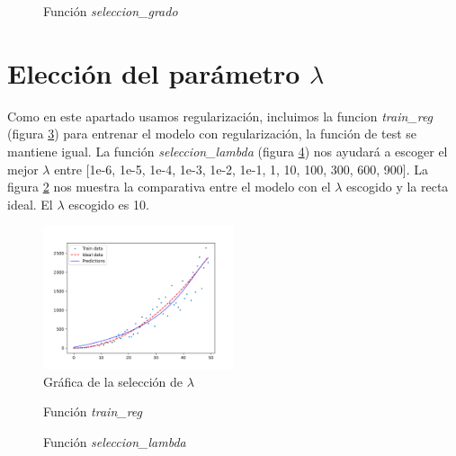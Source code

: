 \documentclass[6pt]{../../shared/AiTex}
\begin{document}
\begin{figure}[H]
    \centering
    
    \caption{Función \textit{seleccion\_grado}}
    \label{fig:seleccion_grado}
\end{figure}

\section{Elección del parámetro $\lambda$}

Como en este apartado usamos regularización, incluimos la funcion \textit{train\_reg} (figura \ref{fig:train_reg}) para entrenar el modelo con regularización, la función de test se mantiene igual. La función \textit{seleccion\_lambda} (figura \ref{fig:seleccion_lambda}) nos ayudará a escoger el mejor $\lambda$ entre [1e-6, 1e-5, 1e-4, 1e-3, 1e-2, 1e-1, 1, 10, 100, 300, 600, 900]. La figura \ref{fig:seleccion_lambda_plot} nos muestra la comparativa entre el modelo con el $\lambda$ escogido y la recta ideal. El $\lambda$ escogido es 10.

\begin{figure}[H]
    \centering
    \includegraphics[width=0.5\textwidth]{./images/lambda.png}
    \caption{Gráfica de la selección de $\lambda$}
    \label{fig:seleccion_lambda_plot}
\end{figure}

\begin{figure}[H]
    \centering
    
    \caption{Función \textit{train\_reg}}
    \label{fig:train_reg}
\end{figure}

\begin{figure}[H]
    \centering
    
    \caption{Función \textit{seleccion\_lambda}}
    \label{fig:seleccion_lambda}
\end{figure}
\end{document}
